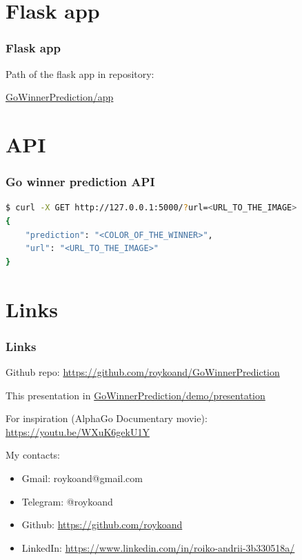 \documentclass{beamer}
\begin{document}

\section{Flask app}
\begin{frame}
\frametitle{Flask app}

\begin{center}
Path of the flask app in repository: 

\url{GoWinnerPrediction/app}
\end{center}

\end{frame}

\section{API}
\begin{frame}[fragile]
\frametitle{Go winner prediction API}
\begin{lstlisting}[basicstyle=\footnotesize, language=bash]
$ curl -X GET http://127.0.0.1:5000/?url=<URL_TO_THE_IMAGE>
{
    "prediction": "<COLOR_OF_THE_WINNER>",
    "url": "<URL_TO_THE_IMAGE>"
}
\end{lstlisting}

\end{frame}

\section{Links}
\begin{frame}
\frametitle{Links}

Github repo: \url{https://github.com/roykoand/GoWinnerPrediction}

This presentation in \url{GoWinnerPrediction/demo/presentation}

For inspiration (AlphaGo Documentary movie): \url{https://youtu.be/WXuK6gekU1Y}
\end{frame}



\begin{frame}
My contacts:
\begin{itemize}
\frametitle{The end :)}

\item Gmail: roykoand@gmail.com
\item Telegram: @roykoand
\item Github: \url{https://github.com/roykoand}
\item LinkedIn: \url{https://www.linkedin.com/in/roiko-andrii-3b330518a/}

\end{itemize}
\end{frame}

\end{document}
